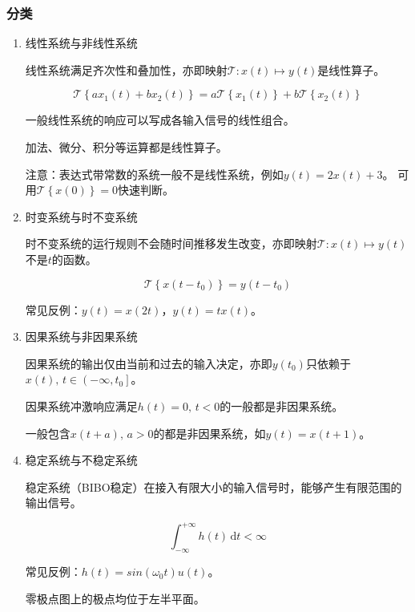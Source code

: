 \documentclass[UTF8,fontset=fandol,zihao=5]{ctexart}
\newcommand{\dd}{\,\mathrm{d}}
\begin{document}
\subsubsection{分类}

\begin{enumerate}
  
  \item 线性系统与非线性系统
  
  线性系统满足齐次性和叠加性，亦即映射$\mathcal{T} : x(t) \mapsto y(t)$是线性算子。
  
  \begin{methodbox}[线性系统的判定]
  
    \[\mathcal{T}\left\{ax_1(t) + bx_2(t)\right\} = a\mathcal{T}\left\{x_1(t)\right\} + b\mathcal{T}\left\{x_2(t)\right\}\]
  
  一般线性系统的响应可以写成各输入信号的线性组合。

  加法、微分、积分等运算都是线性算子。
  
  注意：表达式带常数的系统一般不是线性系统，例如$y(t)=2x(t)+3$。
  可用$\mathcal{T}\left\{x(0)\right\}=0$快速判断。
  
  \end{methodbox}

  \item 时变系统与时不变系统
  
  时不变系统的运行规则不会随时间推移发生改变，亦即映射$\mathcal{T} : x(t) \mapsto y(t)$不是$t$的函数。

  \begin{methodbox}[时不变系统的判定]
    \[\mathcal{T}\left\{x(t-t_0)\right\} = y(t-t_0)\]
    
    常见反例：$y(t)=x(2t)$，$y(t)=tx(t)$。
  \end{methodbox}

  \item 因果系统与非因果系统
  
  因果系统的输出仅由当前和过去的输入决定，亦即$y(t_0)$只依赖于$x(t), \, t \in \left ( -\infty, t_0 \right ]$。

  \begin{methodbox}[因果系统的判定]
    因果系统冲激响应满足$h(t)=0,\, t<0$的一般都是非因果系统。
    
    一般包含$x(t+a),\, a>0$的都是非因果系统，如$y(t)=x(t+1)$。
  \end{methodbox}

  \item 稳定系统与不稳定系统

  稳定系统（BIBO稳定）在接入有限大小的输入信号时，能够产生有限范围的输出信号。

  \begin{methodbox}[稳定系统的判定]
    \[\int_{-\infty}^{+\infty} h(t) \dd t < \infty\]
    
    常见反例：$h(t)=sin(\omega_0 t)u(t)$。
  \end{methodbox}

  \begin{methodbox}[因果稳定系统的判定]
    零极点图上的极点均位于左半平面。
  \end{methodbox}

\end{enumerate}
\end{document}
